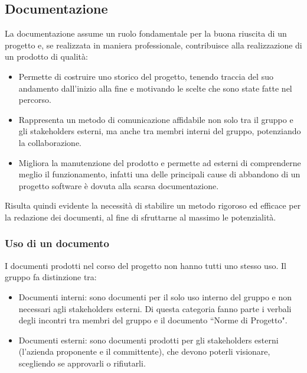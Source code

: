 \subsection{Documentazione}\label{sec:processi_di_supporto:documentazione}
La documentazione assume un ruolo fondamentale per la buona riuscita di un progetto e, se realizzata in maniera professionale, contribuisce alla realizzazione di un prodotto di qualità:
\begin{itemize}
    \item Permette di costruire uno storico del progetto, tenendo traccia del suo andamento dall'inizio alla fine e motivando le scelte che sono state fatte nel percorso.
    \item Rappresenta un metodo di comunicazione affidabile non solo tra il gruppo e gli stakeholders esterni, ma anche tra membri interni del gruppo, potenziando la collaborazione.
    \item Migliora la manutenzione del prodotto e permette ad esterni di comprenderne meglio il funzionamento, infatti una delle principali cause di abbandono di un progetto software è dovuta alla scarsa documentazione.
\end{itemize}
Risulta quindi evidente la necessità di stabilire un metodo rigoroso ed efficace per la redazione dei documenti, al fine di sfruttarne al massimo le potenzialità.
\subsubsection{Uso di un documento}
I documenti prodotti nel corso del progetto non hanno tutti uno stesso uso. Il gruppo fa distinzione tra:
\begin{itemize}
    \item Documenti interni: sono documenti per il solo uso interno del gruppo e non necessari agli stakeholders esterni. Di questa categoria fanno parte i verbali degli incontri tra membri del gruppo e il documento ``Norme di Progetto".
    \item Documenti esterni: sono documenti prodotti per gli stakeholders esterni (l'azienda proponente e il committente), che devono poterli visionare, scegliendo se approvarli o rifiutarli.
\end{itemize}
